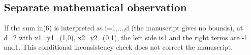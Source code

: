 \documentclass[11pt]{article}
\theoremstyle{definition}
\theoremstyle{remark}
\begin{document}
\subsection*{Separate mathematical observation}\label{GELFAND-P001412-EDITORIAL-MATH-01}
If the sum in(6) is interpreted as i=1,...,d (the manuscript gives no bounds), at d=2 with x1=y1=(1,0), x2=y2=(0,1), the left side is1 and the right terms are -1 and1. This conditional inconsistency check does not correct the manuscript.\par
\end{document}
